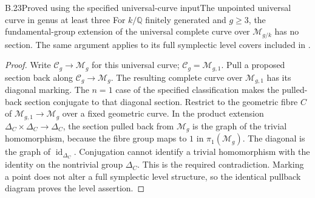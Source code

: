 \begin{statement}{B.23}{Proved using the specified universal-curve input}{The unpointed universal curve in genus at least three}
For $k/\mathbb Q$ finitely generated and $g\geq3$, the fundamental-group
extension of the universal complete curve over $\mathcal M_{g/k}$ has
no section.  The same argument applies to its full symplectic level
covers included in \cite[Remark on topologically ample families]{B_LuoWatanabe}.
\end{statement}
\begin{proof}
Write $\mathcal C_g\to\mathcal M_g$ for this universal curve;
$\mathcal C_g=\mathcal M_{g,1}$.  Pull a proposed section back along
$\mathcal C_g\to\mathcal M_g$.  The resulting complete curve over
$\mathcal M_{g,1}$ has its diagonal marking.  The $n=1$ case of the
specified classification makes the pulled-back section conjugate
to that diagonal section.  Restrict to the geometric fibre $C$
of $\mathcal M_{g,1}\to\mathcal M_g$ over a fixed geometric curve.
In the product extension
$\Delta_C\times\Delta_C\to\Delta_C$, the section pulled back from
$\mathcal M_g$ is the graph of the trivial homomorphism, because
the fibre group maps to $1$ in $\pi_1(\mathcal M_g)$.
The diagonal is the graph of $\operatorname{id}_{\Delta_C}$.
Conjugation cannot identify a trivial homomorphism with the
identity on the nontrivial group $\Delta_C$.  This is the required
contradiction.  Marking a point does not alter a full symplectic
level structure, so the identical pullback diagram proves the
level assertion.
\end{proof}

